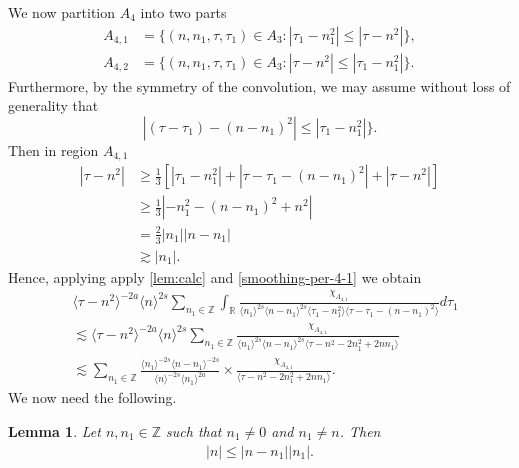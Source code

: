 \documentclass[12pt,reqno]{amsart}
\numberwithin{equation}{section}  %
\numberwithin{figure}{section}
\newcommand{\rr}{\mathbb{R}}
\newcommand{\zz}{\mathbb{Z}}
\theoremstyle{plain}
\newtheorem{lemma}{Lemma}
\theoremstyle{definition}
\theoremstyle{remark}
\begin{document}
%
%
We now 
partition $ A_{4}$ into two parts
\begin{align*}
A_{4,1}&=\{(n, n_1, \tau, \tau_1)\in A_3: |\tau_1-n_1^2|\leq|\tau-n^2|\},\\
A_{4,2}&=\{(n, n_1, \tau, \tau_1)\in A_3: |\tau-n^2|\leq|\tau_1-n_1^2| \}.
\end{align*} 
Furthermore, by the symmetry of the convolution, we may assume without loss of
generality that
$$|(\tau-\tau_1)-(n-n_1)^2|\leq|\tau_1-n_1^2|\}.$$
Then in region $A_{4,1}$
\begin{equation}
\begin{split}
  | \tau - n^{2} |
  & \ge \frac{1}{3}\left[ | \tau_{1} - n_{1}^{2} | + | \tau -
  \tau_{1} - (n - n_{1})^{2}
  | + | \tau - n^{2} | \right]
  \\
  & \ge \frac{1}{3} | - n_{1}^{2} - (n - n_{1})^{2} + n^{2} |
  \\
  & = \frac{2}{3} | n_{1} | | n - n_{1} |
  \\
  & \gtrsim | n_{1} |. 
\end{split}
\label{smoothing-per-4-1}
\end{equation}
%
%
Hence, applying apply \autoref{lem:calc} and \eqref{smoothing-per-4-1}
we obtain
%
%
%
%
\begin{equation}
  \label{region-a41}
\begin{split}
& \langle \tau - n^{2}  \rangle ^{-2a} \langle n
    \rangle ^{2s}
    \sum_{n_{1} \in \zz} \int_{\rr} \frac{\chi_{A_{4,1}}}{ \langle n_{1} \rangle ^{2s} \langle n-n_{1} \rangle ^{2s} 
\langle \tau_{1} - n_{1}^{2}  \rangle \langle  \tau - \tau_{1} - (n -
n_{1})^{2}  \rangle}
d \tau_1 
\\
& \lesssim \langle \tau - n^{2} \rangle ^{-2a} \langle n \rangle ^{2s}
\sum_{n_{1} \in
\zz}  \frac{\chi_{A_{4,1}}}{\langle n_{1} \rangle ^{2s} \langle n - n_{1} \rangle
^{2s} \langle \tau - n^{2} - 2n_{1}^{2} + 2nn_{1}  \rangle }
\\
& \lesssim 
\sum_{n_{1} \in
\zz}  \frac{\langle n_1 \rangle ^{-2s} \langle n - n_{1} \rangle ^{-2s}}{\langle
n \rangle ^{-2s} \langle n_{1} \rangle
^{2a}} \times \frac{\chi_{A_{4,1}}}{\langle \tau - n^{2} - 2n_{1}^{2} + 2nn_{1}
\rangle }.
\end{split}
\end{equation}
%
%
We now need the following. 
%
%
%
%
%
%
%
%
\begin{lemma}
  Let $n, n_1 \in \zz$ such that $n_{1} \neq 0$ and $n_{1} \neq n$.
  Then
  \begin{equation*}
  \begin{split}
    | n | \le | n - n_{1} | | n_{1} |.
  \end{split}
  \end{equation*}
\label{lem:integer-bound}
\end{lemma}
\end{document}
